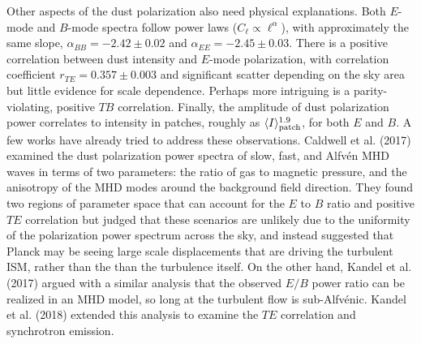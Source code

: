 \documentclass[a4paper,10pt]{article}
\begin{document}
{\noindent}Other aspects of the dust polarization also need physical explanations. Both $E$-mode and $B$-mode spectra follow power laws ($C_\ell \propto \ell^\alpha$), with approximately the same slope, $\alpha_{BB} = -2.42\pm0.02$ and $\alpha_{EE} = -2.45\pm0.03$. There is a positive correlation between dust intensity and $E$-mode polarization, with correlation coefficient $r_{TE} = 0.357\pm0.003$ and significant scatter depending on the sky area but little evidence for scale dependence. Perhaps more intriguing is a parity-violating, positive $TB$ correlation. Finally, the amplitude of dust polarization power correlates to intensity in patches, roughly as $\langle I\rangle_{\rm patch}^{1.9}$, for both $E$ and $B$. A few works have already tried to address these observations. Caldwell et al. (2017) examined the dust polarization power spectra of slow, fast, and Alfv\'en MHD waves in terms of two parameters: the ratio of gas to magnetic pressure, and the anisotropy of the MHD modes around the background field direction. They found two regions of parameter space that can account for the $E$ to $B$ ratio and positive $TE$ correlation but judged that these scenarios are unlikely due to the uniformity of the polarization power spectrum across the sky, and instead suggested that Planck may be seeing large scale displacements that are driving the turbulent ISM, rather than the than the turbulence itself. On the other hand, Kandel et al. (2017) argued with a similar analysis that the observed $E/B$ power ratio can be realized in an MHD model, so long at the turbulent flow is sub-Alfv\'enic. Kandel et al. (2018) extended this analysis to examine the $TE$ correlation and synchrotron emission.
\end{document}
